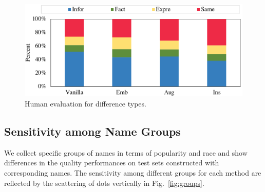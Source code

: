 \begin{figure}[t]
	\centering
	\includegraphics[width=0.9\columnwidth]{humaneval.pdf}
	\caption{Human evaluation for difference types.} %
	\label{fig:humaneval}
\end{figure}



\subsection{Sensitivity among Name Groups}
\label{sec:unfairness}
We collect specific groups of names in terms of popularity and race and show differences in the quality performances on test sets constructed with corresponding names. 
The sensitivity among different groups for each method are reflected by the scattering of dots vertically in Fig.~\ref{fig:groups}.%




%	

